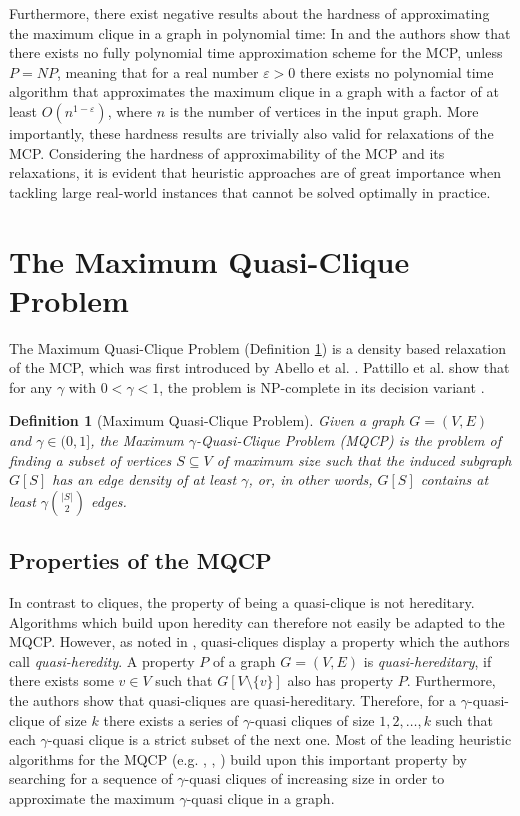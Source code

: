 \documentclass[draft,final]{vutinfth} %
\newtheorem{definition}{Definition}[section]
\begin{document}
Furthermore, there exist negative results about the hardness of approximating the maximum clique in a graph in polynomial time: In \cite{Hastad1999} and \cite{Zuckerman2007} the authors show that there exists no fully polynomial time approximation scheme for the MCP, unless $\mathit{P} = \mathit{NP}$, meaning that for a real number $\varepsilon > 0$ there exists no polynomial time algorithm that approximates the maximum clique in a graph with a factor of at least $O(n^{1-\varepsilon})$, where $n$ is the number of vertices in the input graph. More importantly, these hardness results are trivially also valid for relaxations of the MCP. Considering the hardness of approximability of the MCP and its relaxations, it is evident that heuristic approaches are of great importance when tackling large real-world instances that cannot be solved optimally in practice. 

\section{The Maximum Quasi-Clique Problem}\label{sec:mqcp}

The Maximum Quasi-Clique Problem (Definition \ref{def:mqcp}) is a density based relaxation of the MCP, which was first introduced by Abello et al. \cite{Abello2002}. Pattillo et al. show that for any $\gamma$ with $0 < \gamma < 1$, the problem is NP-complete in its decision variant \cite{pattillo_maximum_2013}. 

\begin{definition}[Maximum Quasi-Clique Problem]
	\label{def:mqcp}
	Given a graph $G = (V,E)$ and $\gamma \in (0,1]$, the Maximum $\gamma$-Quasi-Clique Problem (MQCP) is the problem of finding a subset of vertices $S \subseteq V$ of maximum size 
	such that the induced subgraph $G[S]$ has an edge density of at least $\gamma$, or, in other words, $G[S]$ contains at least $\gamma \binom{|S|}{2}$ edges. 
\end{definition}

\subsection{Properties of the MQCP}
In contrast to cliques, the property of being a quasi-clique is not hereditary. Algorithms which build upon heredity can therefore not easily be adapted to the MQCP. However, as noted in \cite{pattillo_maximum_2013}, quasi-cliques display a property which the authors call \textit{quasi-heredity}. A property $P$ of a graph $G = (V, E)$ is \textit{quasi-hereditary}, if there exists some $v \in V$ such that $G[V \setminus \{v\}]$ also has property $P$. Furthermore, the authors show that quasi-cliques are quasi-hereditary. Therefore, for a $\gamma$-quasi-clique of size $k$ there exists a series of $\gamma$-quasi cliques of size $1,2, \dots, k$ such that each $\gamma$-quasi clique is a strict subset of the next one. Most of the leading heuristic algorithms for the MQCP (e.g. \cite{djeddi_extension_2019}, \cite{zhou_opposition-based_2020}, \cite{chen_nuqclq_2021}) build upon this important property by searching for a sequence of $\gamma$-quasi cliques of increasing size in order to approximate the maximum $\gamma$-quasi clique in a graph. 
\end{document}
